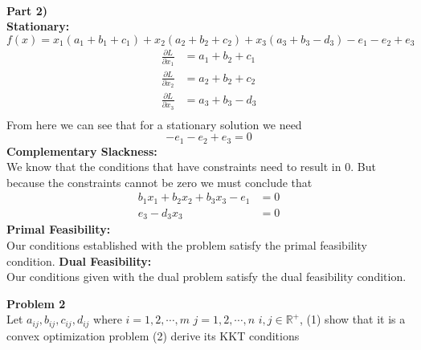 \documentclass[12pt,letter]{article}
\newcommand{\problem}[1]{\vspace{3mm}\Large\textbf{{Problem {#1}\vspace{3mm}}}\normalsize\\}
\newcommand{\ppart}[1]{\vspace{2mm}\large\textbf{\\Part {#1})\vspace{2mm}}\normalsize\\}
\newcommand{\condition}[1]{\vspace{1mm}\textbf{{#1}:}\normalsize\\}
\begin{document}
\ppart{2}
\condition{Stationary}
\vspace{-0.2cm}
\[
    f(x) = x_1(a_1+b_1+c_1) + x_2(a_2+b_2+c_2) + x_3(a_3+b_3-d_3)-e_1-e_2+e_3
\]
\begin{align*}
    \frac{\partial L}{\partial x_1} &= a_1 + b_2 + c_1\\ 
    \frac{\partial L}{\partial x_2} &= a_2 + b_2 + c_2\\ 
    \frac{\partial L}{\partial x_3} &= a_3 + b_3 - d_3\\ 
\end{align*}
\vspace{-0.2cm}
From here we can see that for a stationary solution we need 
\[
    -e_1 - e_2 + e_3 = 0
\]
\condition{Complementary Slackness}
We know that the conditions that have constraints need to result in 0. But because
the constraints cannot be zero we must conclude that
\begin{align*}
    b_1x_1 + b_2x_2 + b_3x_3 - e_1 &= 0 \\
    e_3 - d_3x_3 &= 0
\end{align*}
\condition{Primal Feasibility}
Our conditions established with the problem satisfy the primal feasibility condition.
\condition{Dual Feasibility}
Our conditions given with the dual problem satisfy the dual feasibility condition.

\problem{2}
Let $a_{ij},b_{ij},c_{ij},d_{ij}$ where $i=1,2,\cdots,m$ $j=1,2,\cdots,n$ 
$i,j\in\mathbb{R^{+}}$, (1) show that it is a convex optimization problem
(2) derive its KKT conditions
\end{document}
